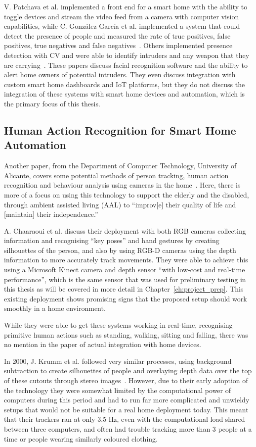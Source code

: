 V. Patchava et al. implemented a front end for a smart home with the ability to toggle devices and stream the video feed from a camera with computer vision capabilities, while C. González García et al. implemented a system that could detect the presence of people and measured the rate of true positives, false positives, true negatives and false negatives~\cite{Patc15,Garc17}.
Others implemented presence detection with CV and were able to identify intruders and any weapon that they are carrying~\cite{Cucc05,Nand20}.
These papers discuss facial recognition software and the ability to alert home owners of potential intruders.
They even discuss integration with custom smart home dashboards and IoT platforms, but they do not discuss the integration of these systems with smart home devices and automation, which is the primary focus of this thesis.

\subsection{Human Action Recognition for Smart Home Automation}
Another paper, from the Department of Computer Technology, University of Alicante, covers some potential methods of person tracking, human action recognition and behaviour analysis using cameras in the home~\cite{Chaa13}.
Here, there is more of a focus on using this technology to support the elderly and the disabled, through ambient assisted living (AAL) to ``improv[e] their quality of life and [maintain] their independence.''

A. Chaaraoui et al. discuss their deployment with both RGB cameras collecting information and recognising ``key poses'' and hand gestures by creating silhouettes of the person, and also by using RGB-D cameras using the depth information to more accurately track movements.
They were able to achieve this using a Microsoft Kinect camera and depth sensor ``with low-cost and real-time performance'', which is the same sensor that was used for preliminary testing in this thesis as will be covered in more detail in Chapter~\ref{ch:project_prep}.
This existing deployment shows promising signs that the proposed setup should work smoothly in a home environment.

While they were able to get these systems working in real-time, recognising primitive human actions such as standing, walking, sitting and falling, there was no mention in the paper of actual integration with home devices.

In 2000, J. Krumm et al. followed very similar processes, using background subtraction to create silhouettes of people and overlaying depth data over the top of these cutouts through stereo images~\cite{Krum00}.
However, due to their early adoption of the technology they were somewhat limited by the computational power of computers during this period and had to run far more complicated and unwieldy setups that would not be suitable for a real home deployment today.
This meant that their trackers ran at only 3.5 Hz, even with the computational load shared between three computers, and often had trouble tracking more than 3 people at a time or people wearing similarly coloured clothing.

